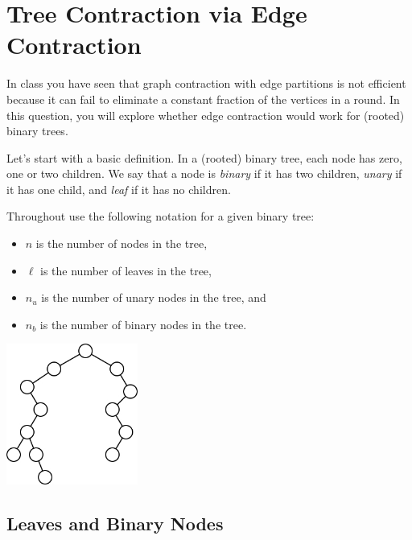 
\section{Tree Contraction via Edge Contraction}

In class you have seen that graph contraction with edge partitions is
not efficient because it can fail to eliminate a constant fraction of
the vertices in a round.  
%
In this question, you will explore whether edge contraction would work
for (rooted) binary trees.

Let's start with a basic definition. 
%
In a (rooted) binary tree, each node has zero, one or two children. 
%
We say that
a node is {\em binary} if it has two children, {\em unary} if it has
one child, and {\em leaf} if it has no children.  
%


Throughout use the following notation for a given binary tree:
%
{
\flushleft
\begin{minipage}[b]{4in}
\begin{itemize}
\item $n$ is the number of nodes in the tree,
\item $\ell$ is the number of leaves in the tree, 
\item $n_u$ is the number of unary nodes in the tree, and 
\item $n_b$ is the number of binary nodes in the tree.
\end{itemize}
\end{minipage}
\begin{minipage}{2in}
\begin{center}
\includegraphics[width=1.7in]{media/binary-tree.jpg}
\end{center}
\end{minipage}
}


\subsection{Leaves and Binary Nodes}

